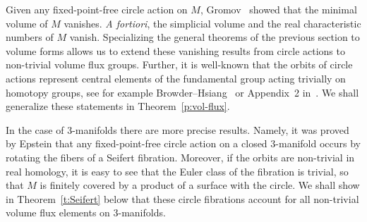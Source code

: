 \documentclass[12pt]{amsart}
\theoremstyle{definition}
\theoremstyle{remark}
\begin{document}
Given any fixed-point-free circle action on $M$, Gromov~\cite{Gromov} 
showed that the minimal volume of $M$ vanishes. {\it A fortiori}, the 
simplicial volume and the real characteristic numbers of $M$ vanish. 
Specializing the general theorems of the previous section to volume
forms allows us to extend these vanishing results from circle actions to 
non-trivial volume flux groups. Further, it is well-known that the orbits of 
circle actions represent central elements of the fundamental group acting 
trivially on homotopy groups, see for example Browder--Hsiang~\cite{BH} or 
Appendix~2 in~\cite{Gromov}. We shall generalize these statements in 
Theorem~\ref{p:vol-flux}.

In the case of $3$-manifolds there are more precise results. Namely, it 
was proved by Epstein that any fixed-point-free circle action on a closed 
$3$-manifold occurs by rotating the fibers of a Seifert fibration. Moreover, 
if the orbits are non-trivial in real homology, it is easy to see that the 
Euler class of the fibration is trivial, so that $M$ is finitely covered by a 
product of a surface with the circle. We shall show in Theorem~\ref{t:Seifert} 
below that these circle fibrations account for all non-trivial volume flux 
elements on $3$-manifolds.
\end{document}
